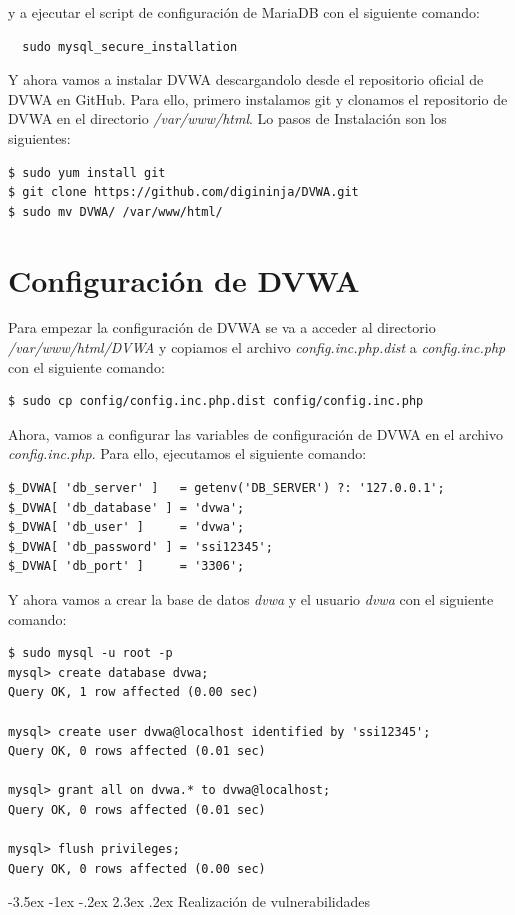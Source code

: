 \documentclass[11pt]{report}
\makeatletter
\renewcommand\chapter{\@startsection{chapter}{0}{\z@}%
    {-3.5ex \@plus -1ex \@minus -.2ex}%
    {2.3ex \@plus.2ex}%
    {\normalfont\Large\bfseries}}
\makeatother
\begin{document}
y a ejecutar el script de configuración de MariaDB con el siguiente comando:
\begin{BVerbatim}
  sudo mysql_secure_installation
\end{BVerbatim}

Y ahora vamos a instalar DVWA descargandolo desde el repositorio oficial de DVWA en GitHub. Para ello, primero instalamos git y clonamos el repositorio de DVWA en el directorio
\emph{/var/www/html}. Lo pasos de Instalación son los siguientes:
\begin{verbatim}
$ sudo yum install git
$ git clone https://github.com/digininja/DVWA.git
$ sudo mv DVWA/ /var/www/html/
\end{verbatim}

\section{Configuración de DVWA}
Para empezar la configuración de DVWA se va a acceder al directorio \emph{/var/www/html/DVWA} y copiamos el archivo \emph{config.inc.php.dist} a
\emph{config.inc.php} con el siguiente comando:
\begin{verbatim}
$ sudo cp config/config.inc.php.dist config/config.inc.php
\end{verbatim}

Ahora, vamos a configurar las variables de configuración de DVWA en el archivo \emph{config.inc.php}. Para ello, ejecutamos el siguiente comando:
\begin{verbatim}
$_DVWA[ 'db_server' ]   = getenv('DB_SERVER') ?: '127.0.0.1';
$_DVWA[ 'db_database' ] = 'dvwa';
$_DVWA[ 'db_user' ]     = 'dvwa';
$_DVWA[ 'db_password' ] = 'ssi12345';
$_DVWA[ 'db_port' ]     = '3306';
\end{verbatim}

Y ahora vamos a crear la base de datos \emph{dvwa} y el usuario \emph{dvwa} con el siguiente comando:
\begin{verbatim}
$ sudo mysql -u root -p
mysql> create database dvwa;
Query OK, 1 row affected (0.00 sec)

mysql> create user dvwa@localhost identified by 'ssi12345';
Query OK, 0 rows affected (0.01 sec)

mysql> grant all on dvwa.* to dvwa@localhost;
Query OK, 0 rows affected (0.01 sec)

mysql> flush privileges;
Query OK, 0 rows affected (0.00 sec)
\end{verbatim}

\chapter{Realización de vulnerabilidades}
\end{document}
